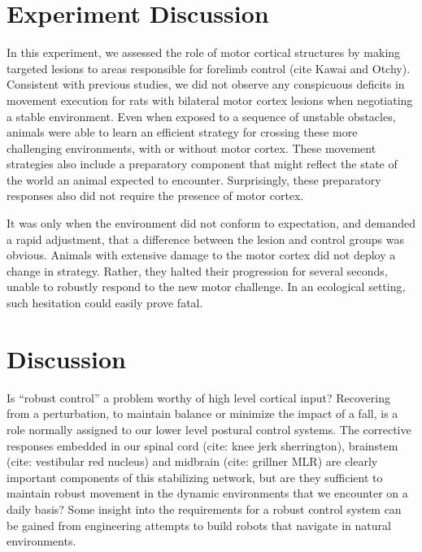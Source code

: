 \section{Experiment Discussion}

In this experiment, we assessed the role of motor cortical structures by making targeted lesions to areas responsible for forelimb control (cite Kawai and Otchy). Consistent with previous studies, we did not observe any conspicuous deficits in movement execution for rats with bilateral motor cortex lesions when negotiating a stable environment. Even when exposed to a sequence of unstable obstacles, animals were able to learn an efficient strategy for crossing these more challenging environments, with or without motor cortex. These movement strategies also include a preparatory component that might reflect the state of the world an animal expected to encounter. Surprisingly, these preparatory responses also did not require the presence of motor cortex.

It was only when the environment did not conform to expectation, and demanded a rapid adjustment, that a difference between the lesion and control groups was obvious. Animals with extensive damage to the motor cortex did not deploy a change in strategy. Rather, they halted their progression for several seconds, unable to robustly respond to the new motor challenge. In an ecological setting, such hesitation could easily prove fatal.

\section{Discussion}

Is ``robust control'' a problem worthy of high level cortical input? Recovering from a perturbation, to maintain balance or minimize the impact of a fall, is a role normally assigned to our lower level postural control systems. The corrective responses embedded in our spinal cord (cite: knee jerk sherrington), brainstem (cite: vestibular red nucleus) and midbrain (cite: grillner MLR) are clearly important components of this stabilizing network, but are they sufficient to maintain robust movement in the dynamic environments that we encounter on a daily basis? Some insight into the requirements for a robust control system can be gained from engineering attempts to build robots that navigate in natural environments.

